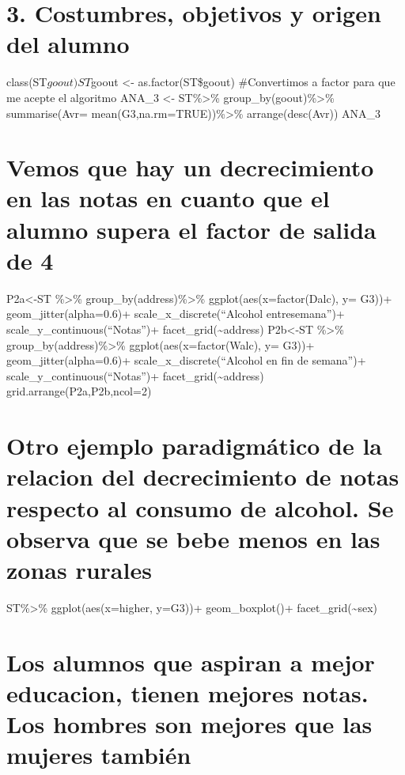 \documentclass[]{article}
\begin{document}
\section{3. Costumbres, objetivos y origen del
alumno}\label{costumbres-objetivos-y-origen-del-alumno-1}

class(ST\(goout) ST\)goout \textless{}- as.factor(ST\$goout)
\#Convertimos a factor para que me acepte el algoritmo ANA\_3
\textless{}- ST\%\textgreater{}\% group\_by(goout)\%\textgreater{}\%
summarise(Avr= mean(G3,na.rm=TRUE))\%\textgreater{}\% arrange(desc(Avr))
ANA\_3

\section{Vemos que hay un decrecimiento en las notas en cuanto que el
alumno supera el factor de salida de
4}\label{vemos-que-hay-un-decrecimiento-en-las-notas-en-cuanto-que-el-alumno-supera-el-factor-de-salida-de-4}

P2a\textless{}-ST \%\textgreater{}\%
group\_by(address)\%\textgreater{}\% ggplot(aes(x=factor(Dalc), y= G3))+
geom\_jitter(alpha=0.6)+ scale\_x\_discrete(``Alcohol entresemana'')+
scale\_y\_continuous(``Notas'')+ facet\_grid(\textasciitilde{}address)
P2b\textless{}-ST \%\textgreater{}\%
group\_by(address)\%\textgreater{}\% ggplot(aes(x=factor(Walc), y= G3))+
geom\_jitter(alpha=0.6)+ scale\_x\_discrete(``Alcohol en fin de
semana'')+ scale\_y\_continuous(``Notas'')+
facet\_grid(\textasciitilde{}address) grid.arrange(P2a,P2b,ncol=2)

\section{Otro ejemplo paradigmático de la relacion del decrecimiento de
notas respecto al consumo de alcohol. Se observa que se bebe menos en
las zonas
rurales}\label{otro-ejemplo-paradigmatico-de-la-relacion-del-decrecimiento-de-notas-respecto-al-consumo-de-alcohol.-se-observa-que-se-bebe-menos-en-las-zonas-rurales}

ST\%\textgreater{}\% ggplot(aes(x=higher, y=G3))+ geom\_boxplot()+
facet\_grid(\textasciitilde{}sex)

\section{Los alumnos que aspiran a mejor educacion, tienen mejores
notas. Los hombres son mejores que las mujeres
también}\label{los-alumnos-que-aspiran-a-mejor-educacion-tienen-mejores-notas.-los-hombres-son-mejores-que-las-mujeres-tambien}
\end{document}
